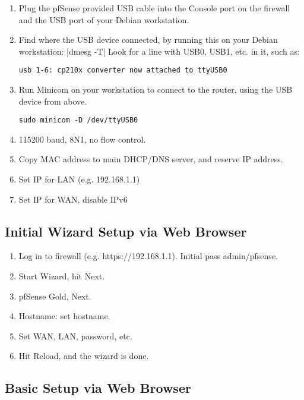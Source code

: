 \begin{enumerate}
 \item Plug the pfSense provided USB cable into the Console port on the firewall and the USB port of your Debian workstation.
 \item Find where the USB device connected, by running this on your Debian workstation:
|dmesg -T|
Look for a line with USB0, USB1, etc. in it, such as:
\begin{verbatim}
usb 1-6: cp210x converter now attached to ttyUSB0
\end{verbatim}
 \item Run Minicom on your workstation to connect to the router, using the USB device from above.
\begin{verbatim}
sudo minicom -D /dev/ttyUSB0
\end{verbatim}



 \item 115200 baud, 8N1, no flow control.
 \item Copy MAC address to main DHCP/DNS server, and reserve IP address.
 \item Set IP for LAN (e.g. 192.168.1.1)
 \item Set IP for WAN, disable IPv6
\end{enumerate}

\subsection{Initial Wizard Setup via Web Browser}

\begin{enumerate}
 \item Log in to firewall (e.g. https://192.168.1.1).
       Initial pass admin/pfsense.
 \item Start Wizard, hit Next.
 \item pfSense Gold, Next.
 \item Hostname: set hostname.
 \item Set WAN, LAN, password, etc.
 \item Hit Reload, and the wizard is done.
\end{enumerate}

\subsection{Basic Setup via Web Browser}

